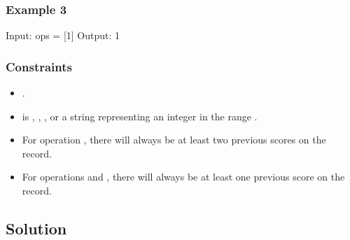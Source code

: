 \documentclass[letterpaper,12pt,english]{book}
\begin{document}
\subsubsection{Example 3}
\label{\detokenize{String/08_STR_682_Baseball_Game:example-3}}
\begin{sphinxVerbatim}[commandchars=\\\{\}]
Input: ops = [\PYGZdq{}1\PYGZdq{}]
Output: 1
\end{sphinxVerbatim}


\subsubsection{Constraints}
\label{\detokenize{String/08_STR_682_Baseball_Game:constraints}}\begin{itemize}
\item {} 
\sphinxAtStartPar
{}.

\item {} 
\sphinxAtStartPar
{} is , , , or a string representing an integer in the range .

\item {} 
\sphinxAtStartPar
For operation , there will always be at least two previous scores on the record.

\item {} 
\sphinxAtStartPar
For operations  and , there will always be at least one previous score on the record.

\end{itemize}


\subsection{Solution}
\label{\detokenize{String/08_STR_682_Baseball_Game:solution}}
\end{document}
